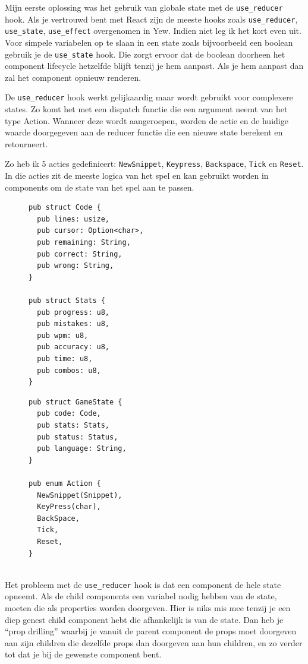 Mijn eerste oplossing was het gebruik van globale state met de \texttt{use_reducer}
hook. Als je vertrouwd bent met React zijn de meeste hooks zoals \texttt{use_reducer},
\texttt{use_state}, \texttt{use_effect} overgenomen in Yew. Indien niet leg
ik het kort even uit. Voor simpele variabelen op te slaan in een state zoals bijvoorbeeld een
boolean gebruik je de \texttt{use_state} hook. Die zorgt ervoor dat de boolean doorheen
het component lifecycle hetzelfde blijft tenzij je hem aanpast. Als je hem aanpast dan zal het
component opnieuw renderen.  

De \texttt{use_reducer} hook werkt gelijkaardig maar wordt gebruikt voor complexere
states. Zo komt het met een dispatch functie die een argument neemt van het type Action. Wanneer
deze wordt aangeroepen, worden de actie en de huidige waarde doorgegeven aan de reducer functie die
een nieuwe state berekent en retourneert.

Zo heb ik 5 acties gedefinieert: \texttt{NewSnippet}, \texttt{Keypress},
\texttt{Backspace}, \texttt{Tick} en \texttt{Reset}. In die acties zit
de meeste logica van het spel en kan gebruikt worden in components om de state van het spel aan te
passen. 

\begin{figure}[h]
\centering
\begin{minipage}{.45\textwidth}
\begin{verbatim}
pub struct Code {
  pub lines: usize,
  pub cursor: Option<char>,
  pub remaining: String,
  pub correct: String,
  pub wrong: String,
}

pub struct Stats {
  pub progress: u8,
  pub mistakes: u8,
  pub wpm: u8,
  pub accuracy: u8,
  pub time: u8,
  pub combos: u8,
}
\end{verbatim}
\end{minipage}%
\begin{minipage}{.45\textwidth}
\begin{verbatim}
pub struct GameState {
  pub code: Code,
  pub stats: Stats,
  pub status: Status,
  pub language: String,
}

pub enum Action {
  NewSnippet(Snippet),
  KeyPress(char),
  BackSpace,
  Tick,
  Reset,
}


\end{verbatim}
\end{minipage}
\end{figure}

Het probleem met de \texttt{use_reducer} hook is dat een component de hele state opneemt.
Als de child components een variabel nodig hebben van de state, moeten die als properties worden
doorgeven. Hier is niks mis mee tenzij je een diep genest child component hebt die afhankelijk is
van de state. Dan heb je “prop drilling” waarbij je vanuit de parent component de props moet
doorgeven aan zijn children die dezelfde props dan doorgeven aan hun children, en zo verder tot dat
je bij de gewenste component bent.

